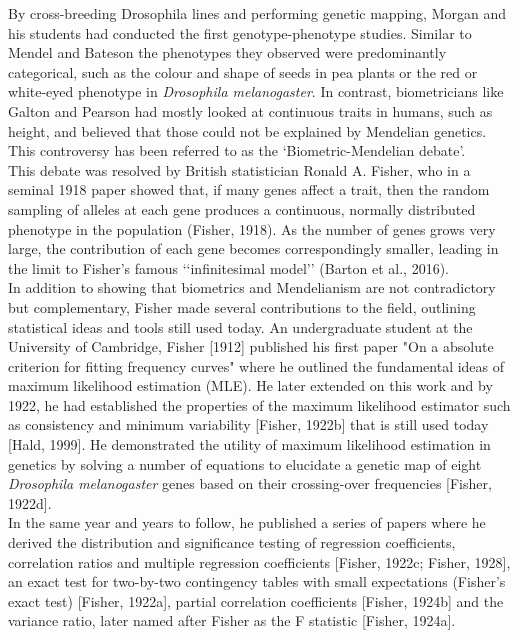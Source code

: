By cross-breeding Drosophila lines and performing genetic mapping, Morgan and his students had conducted the first genotype-phenotype studies. 
Similar to Mendel and Bateson the phenotypes they observed were predominantly categorical, such as the colour and shape of seeds in pea plants or the red or white-eyed phenotype in \textit{Drosophila melanogaster}. 
In contrast, biometricians like Galton and Pearson had mostly looked at continuous traits in humans, such as height, and believed that those could not be explained by Mendelian genetics.
This controversy has been referred to as the ‘Biometric-Mendelian debate’.\\ 

This debate was resolved by British statistician Ronald A. Fisher, who in a seminal 1918 paper showed that, if many genes affect a trait, then the random sampling of alleles at each gene produces a continuous, normally distributed phenotype in the population (Fisher, 1918). 
As the number of genes grows very large, the contribution of each gene becomes correspondingly smaller, leading in the limit to Fisher’s famous ‘‘infinitesimal model’’ (Barton et al., 2016).\\

In addition to showing that biometrics and Mendelianism are not contradictory but complementary, Fisher made several contributions to the field, outlining statistical ideas and tools still used today. 
An undergraduate student at the University of Cambridge, Fisher [1912] published his first paper "On a absolute criterion for fitting frequency curves" where he outlined the fundamental ideas of maximum likelihood estimation (MLE). 
He later extended on this work and by 1922, he had established the properties of the maximum likelihood estimator such as consistency and minimum variability [Fisher, 1922b] that is still used today [Hald, 1999]. 
He demonstrated the utility of maximum likelihood estimation in genetics by solving a number of equations to elucidate a genetic map of eight \textit{Drosophila melanogaster} genes based on their crossing-over frequencies [Fisher, 1922d].\\ 

In the same year and years to follow, he published a series of papers where he derived the distribution and significance testing of regression coefficients, correlation ratios and multiple regression coefficients [Fisher, 1922c; Fisher, 1928], an exact test for two-by-two contingency tables with small expectations (Fisher’s exact test) [Fisher, 1922a], partial correlation coefficients [Fisher, 1924b] and the variance ratio, later named after Fisher as the F statistic [Fisher, 1924a]. 

